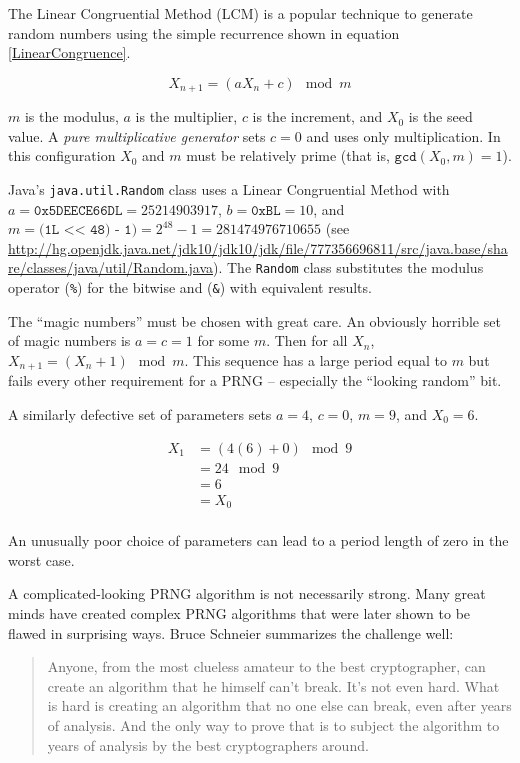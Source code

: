 \documentclass{book}
\begin{document}
The Linear Congruential Method (LCM) \cite{Knuth:1997:ACP:270146} is a popular technique to generate random numbers using the simple recurrence shown in equation \ref{LinearCongruence}.

\begin{equation}\label{LinearCongruence}
X_{n+1}=(aX_n+c) \mod{m}\end{equation}

$m$ is the modulus, $a$ is the multiplier, $c$ is the increment, and $X_0$ is the seed value. A \textit{pure multiplicative generator} sets $c=0$ and uses only multiplication. In this configuration $X_0$ and $m$ must be relatively prime (that is, $\texttt{gcd}(X_0,m)=1$).

Java's \texttt{java.util.Random} class uses a Linear Congruential Method with $a=\texttt{0x5DEECE66DL}=25214903917$, $b=\texttt{0xBL}=10$, and $m=\texttt{(1L << 48) - 1)}=2^{48}-1=281474976710655$ (see \url{http://hg.openjdk.java.net/jdk10/jdk10/jdk/file/777356696811/src/java.base/share/classes/java/util/Random.java}). The \texttt{Random} class substitutes the modulus operator (\texttt{\%}) for the bitwise and (\texttt{\&}) with equivalent results.

The ``magic numbers'' must be chosen with great care. An obviously horrible set of magic numbers is $a=c=1$ for some $m$. Then for all $X_n$, $X_{n+1}=(X_n + 1) \mod{m}$. This sequence has a large period equal to $m$ but fails every other requirement for a PRNG -- especially the ``looking random'' bit.

A similarly defective set of parameters sets $a=4$, $c=0$, $m=9$, and $X_0=6$.

\begin{equation*}
\begin{split}
X_1 &= (4(6) + 0) \mod{9}\\
&= 24 \mod 9\\
&= 6\\
&= X_0\\
\end{split}
\end{equation*}

An unusually poor choice of parameters can lead to a period length of zero in the worst case.

A complicated-looking PRNG algorithm is not necessarily strong. Many great minds have created complex PRNG algorithms that were later shown to be flawed in surprising ways. Bruce Schneier summarizes the challenge well:

\begin{quote}
Anyone, from the most clueless amateur to the best cryptographer, can create an algorithm that he himself can't break. It's not even hard. What is hard is creating an algorithm that no one else can break, even after years of analysis. And the only way to prove that is to subject the algorithm to years of analysis by the best cryptographers around.
\end{quote}
\end{document}
